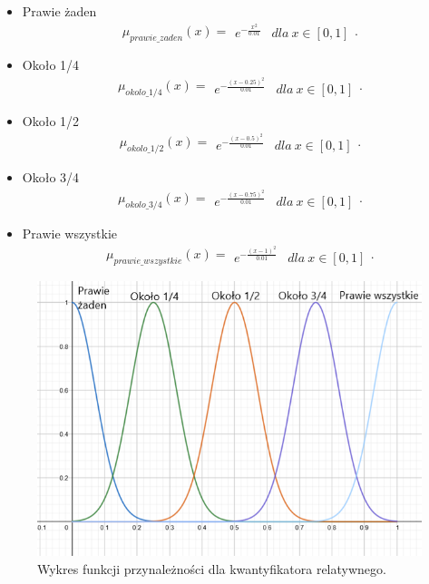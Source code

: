 \documentclass{classrep}
\begin{document}
\begin{itemize}
        \item Prawie żaden
        \begin{equation}
            \mu_{prawie\_zaden}(x) = \begin{matrix} e ^ {-\frac{x^2}{0.01}} & dla \: x\in [0, 1]  \end{matrix}.
        \end{equation}
        \item Około 1/4
        \begin{equation}
            \mu_{okolo\_1/4}(x) =  \begin{matrix} e ^ {-\frac{(x - 0.25)^2}{0.01}} & dla \: x\in [0, 1]  \end{matrix}.
        \end{equation}
        \item Około 1/2
        \begin{equation}
            \mu_{okolo\_1/2}(x) = \begin{matrix} e ^ {-\frac{(x - 0.5)^2}{0.01}} & dla \: x\in [0, 1]  \end{matrix}.
        \end{equation}
        \item Około 3/4
        \begin{equation}
            \mu_{okolo\_3/4}(x) = \begin{matrix} e ^ {-\frac{(x - 0.75)^2}{0.01}} & dla \: x\in [0, 1]  \end{matrix}.
        \end{equation}
        \item Prawie wszystkie
        \begin{equation}
            \mu_{prawie\_wszystkie}(x) = \begin{matrix} e ^ {-\frac{(x - 1)^2}{0.01}} & dla \: x\in [0, 1]  \end{matrix}.
        \end{equation}
    \end{itemize}
\begin{figure}[H]
    \centering
    \includegraphics[width=14cm]{wykres_kwantyfikator_relatywny.png}
    \caption{Wykres funkcji przynależności dla kwantyfikatora relatywnego.}
    \label{rysunek:kwantyfikator_relatywny}
\end{figure}
\end{document}
